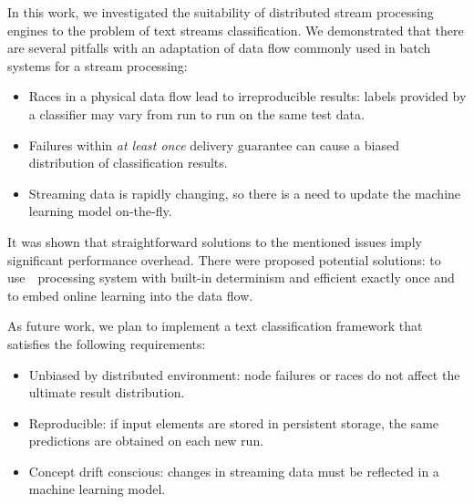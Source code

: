 \label {fs-conclusion}

In this work, we investigated the suitability of distributed stream processing engines to the problem of text streams classification. We demonstrated that there are several pitfalls with an adaptation of data flow commonly used in batch systems for a stream processing:

\begin{itemize}
    \item Races in a physical data flow lead to irreproducible results: labels provided by a classifier may vary from run to run on the same test data. 
    \item Failures within {\em at least once} delivery guarantee can cause a biased distribution of classification results.
    \item Streaming data is rapidly changing, so there is a need to update the machine learning model on-the-fly. 
\end{itemize}

It was shown that straightforward solutions to the mentioned issues imply significant performance overhead. There were proposed potential solutions: to use~\FlameStream\ processing system with built-in determinism and efficient exactly once and to embed online learning into the data flow. 

As future work, we plan to implement a text classification framework that satisfies the following requirements:

\begin{itemize}
    \item Unbiased by distributed environment: node failures or races do not affect the ultimate result distribution.
    \item Reproducible: if input elements are stored in persistent storage, the same predictions are obtained on each new run.
    \item Concept drift conscious: changes in streaming data must be reflected in a machine learning model.  
\end{itemize}
